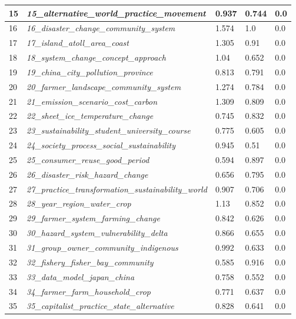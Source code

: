 \documentclass[12pt]{article}
\begin{document}
\begin{longtable}{|l|l|l|l|l|}
15 & \textit{15\_alternative\_world\_practice\_movement} & 0.937 & 0.744 & 0.0 \\ \hline
16 & \textit{16\_disaster\_change\_community\_system} & 1.574 & 1.0 & 0.0 \\ \hline
17 & \textit{17\_island\_atoll\_area\_coast} & 1.305 & 0.91 & 0.0 \\ \hline
18 & \textit{18\_system\_change\_concept\_approach} & 1.04 & 0.652 & 0.0 \\ \hline
19 & \textit{19\_china\_city\_pollution\_province} & 0.813 & 0.791 & 0.0 \\ \hline
20 & \textit{20\_farmer\_landscape\_community\_system} & 1.274 & 0.784 & 0.0 \\ \hline
21 & \textit{21\_emission\_scenario\_cost\_carbon} & 1.309 & 0.809 & 0.0 \\ \hline
22 & \textit{22\_sheet\_ice\_temperature\_change} & 0.745 & 0.832 & 0.0 \\ \hline
23 & \textit{23\_sustainability\_student\_university\_course} & 0.775 & 0.605 & 0.0 \\ \hline
24 & \textit{24\_society\_process\_social\_sustainability} & 0.945 & 0.51 & 0.0 \\ \hline
25 & \textit{25\_consumer\_reuse\_good\_period} & 0.594 & 0.897 & 0.0 \\ \hline
26 & \textit{26\_disaster\_risk\_hazard\_change} & 0.656 & 0.795 & 0.0 \\ \hline
27 & \textit{27\_practice\_transformation\_sustainability\_world} & 0.907 & 0.706 & 0.0 \\ \hline
28 & \textit{28\_year\_region\_water\_crop} & 1.13 & 0.852 & 0.0 \\ \hline
29 & \textit{29\_farmer\_system\_farming\_change} & 0.842 & 0.626 & 0.0 \\ \hline
30 & \textit{30\_hazard\_system\_vulnerability\_delta} & 0.866 & 0.655 & 0.0 \\ \hline
31 & \textit{31\_group\_owner\_community\_indigenous} & 0.992 & 0.633 & 0.0 \\ \hline
32 & \textit{32\_fishery\_fisher\_bay\_community} & 0.585 & 0.916 & 0.0 \\ \hline
33 & \textit{33\_data\_model\_japan\_china} & 0.758 & 0.552 & 0.0 \\ \hline
34 & \textit{34\_farmer\_farm\_household\_crop} & 0.771 & 0.637 & 0.0 \\ \hline
35 & \textit{35\_capitalist\_practice\_state\_alternative} & 0.828 & 0.641 & 0.0 \\ \hline

\end{longtable}
\end{document}
